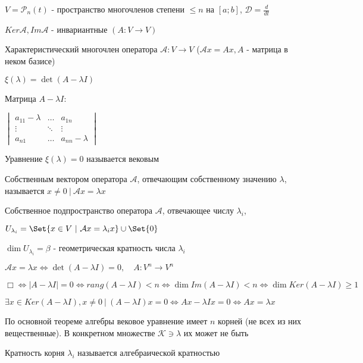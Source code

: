 \documentclass[12pt]{article}
\begin{document}
    \Ex $V = \mathcal{P}_n(t)$ - пространство многочленов степени $\leq n$ на $[a; b]$, $\mathcal{D} = \frac{d}{dt}$

    \Nota $Ker \mathcal{A}, Im \mathcal{A}$ - инвариантные $(A : V \rightarrow V)$

    \hypertarget{eigenvalue}{}

    \Def Характеристический многочлен оператора $\mathcal{A} : V \rightarrow V$
    ($\mathcal{A}x = Ax, A$ - матрица в неком базисе)

    $\xi(\lambda) = \det(A - \lambda I)$

    \Nota Матрица $A - \lambda I$:

    $\begin{vmatrix}a_{11} - \lambda & \dots & a_{1n} \\ \vdots & \ddots & \vdots \\ a_{n1} & \dots & a_{nn} - \lambda \end{vmatrix}$

    \Nota Уравнение $\xi(\lambda) = 0$ называется вековым

    \hypertarget{eigenvector}{}

    \Def Собственным вектором оператора $\mathcal{A}$, отвечающим собственному значению $\lambda$,
    называется $x \neq 0 \ | \ \mathcal{A}x = \lambda x$

    \Def Собственное подпространство оператора $\mathcal{A}$, отвечающее числу $\lambda_i$,

    $U_{\lambda_i} = \Set{x \in V \ | \ \mathcal{A}x = \lambda_i x} \union \Set{0}$

    \Def $\dim U_{\lambda_i} = \beta$ - геометрическая кратность числа $\lambda_i$

    \Th $\mathcal{A}x = \lambda x \Longleftrightarrow \det(A - \lambda I) = 0, \quad A : V^n \rightarrow V^n$

    $\Box \Longleftrightarrow |A - \lambda I| = 0 \Longleftrightarrow rang (A - \lambda I) < n \Longleftrightarrow
    \dim Im(A - \lambda I) < n \Longleftrightarrow \dim Ker(A - \lambda I) \geq 1$

    $\exists x \in Ker(A - \lambda I), x \neq 0 \ | \ (A - \lambda I) x = 0 \Longleftrightarrow Ax - \lambda I x = 0 \Longleftrightarrow Ax = \lambda x$

    \Nota По основной теореме алгебры вековое уравнение имеет $n$ корней (не всех из них вещественные).
    В конкретном множестве $\mathcal{K} \ni \lambda$ их может не быть

    \Def Кратность корня $\lambda_i$ называется алгебраической кратностью
\end{document}
